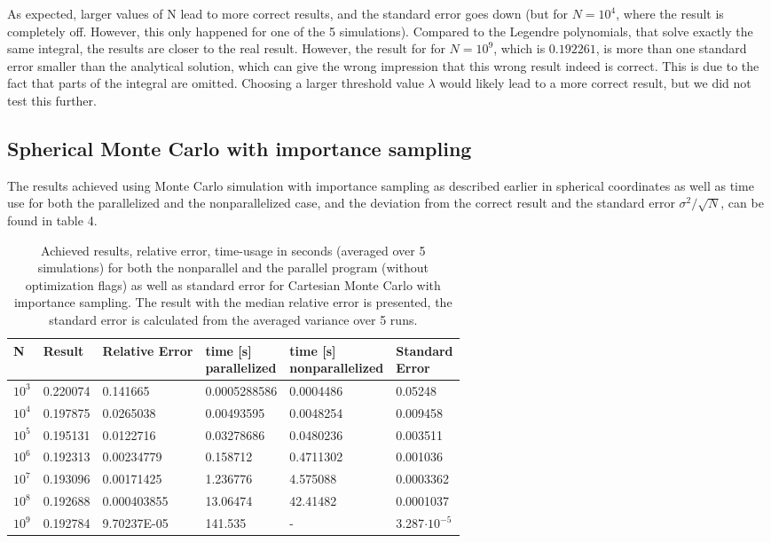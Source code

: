 \documentclass[10pt,a4paper]{article}
\begin{document}
As expected, larger values of N lead to more correct results, and the standard error goes down (but for $N=10^4$, where the result is completely off. However, this only happened for one of the 5 simulations).
Compared to the Legendre polynomials, that solve exactly the same integral, the results are closer to the real result. However, the result for for $N=10^9$, which is $0.192261$, is more than one standard error smaller than the analytical solution, which can give the wrong impression that this wrong result indeed is correct. This is due to the fact that parts of the integral are omitted. Choosing a larger threshold value $\lambda$ would likely lead to a more correct result, but we did not test this further. 
\subsection{Spherical Monte Carlo with importance sampling}
The results achieved using Monte Carlo simulation with importance sampling as described earlier in spherical coordinates as well as time use for both the parallelized and the nonparallelized case, and the deviation from the correct result and the standard error $\sigma^2/\sqrt{N}$, can be found in table 4.

\begin{table}[H]
\caption[Spherical Monte Carlo with importance sampling]{Achieved results, relative error, time-usage in seconds (averaged over 5 simulations) for both the nonparallel and the parallel program (without optimization flags) as well as standard error for Cartesian Monte Carlo with importance sampling.  The result with the median relative error is presented, the standard error is calculated from the averaged variance over 5 runs.}
\begin{tabular}{|l|l|l|l|l|l|}
\hline
N          & Result   & Relative Error & \pbox{10cm}{time {[}s{]}\\ parallelized}  &  \pbox{10cm}{time {[}s{]}\\ nonparallelized} &  \pbox{10cm}{Standard\\ Error} \\ \hline
$10^3$       & 0.220074 & 0.141665    & 0.0005288586 & 0.0004486 & 0.05248   \\\hline
$10^4$      & 0.197875 & 0.0265038   & 0.00493595   & 0.0048254 & 0.009458  \\\hline
$10^5$     & 0.195131 & 0.0122716   & 0.03278686   & 0.0480236 & 0.003511  \\\hline
$10^6$    & 0.192313 & 0.00234779  & 0.158712     & 0.4711302 & 0.001036  \\\hline
$10^7$   & 0.193096 & 0.00171425  & 1.236776     & 4.575088  & 0.0003362 \\\hline
$10^8$  & 0.192688 & 0.000403855 & 13.06474     & 42.41482  & 0.0001037 \\\hline
$10^9$ & 0.192784 & 9.70237E-05 & 141.535      & -       & 3.287$\cdot10^{-5}$\\\hline
\end{tabular}
\end{table}
\end{document}
